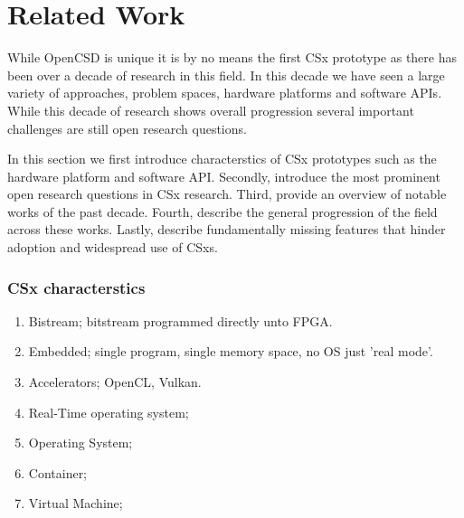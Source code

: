
\chapter{Related Work} %



\ifpdf
    \graphicspath{{7/figures/PNG/}{7/figures/PDF/}{7/figures/}}
\else
    \graphicspath{{7/figures/EPS/}{7/figures/}}
\fi


% 

While OpenCSD is unique it is by no means the first CSx prototype as there
has been over a decade of research in this field\cite{lukken2021past}. In this
decade we have seen a large variety of approaches, problem spaces, hardware
platforms and software APIs. While this decade of research shows overall
progression several important challenges are still open research
questions\cite{barbalacecomputational}.

In this section we first introduce characterstics of CSx prototypes such as the
hardware platform and software API. Secondly, introduce the most prominent open
research questions in CSx research. Third, provide an overview of notable works
of the past decade. Fourth, describe the general progression of the field across
these works. Lastly, describe fundamentally missing features that hinder
adoption and widespread use of CSxs.





\subsection{CSx characterstics}

\begin{enumerate}
    \item Bistream; bitstream programmed directly unto FPGA.
    \item Embedded; single program, single memory space, no OS just 'real mode'.
    \item Accelerators; OpenCL, Vulkan.
    \item Real-Time operating system;
    \item Operating System;
    \item Container;
    \item Virtual Machine;
\end{enumerate}

